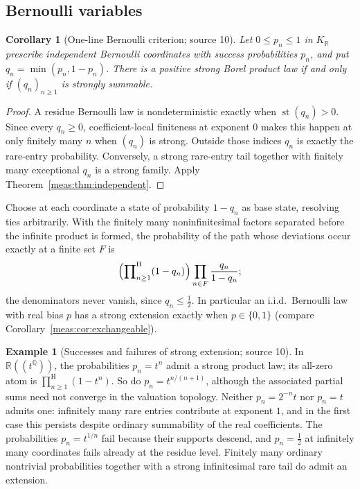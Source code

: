 \documentclass[11pt]{article}
\numberwithin{equation}{section}
\newtheorem{corollary}[theorem]{Corollary}
\theoremstyle{definition}
\newtheorem{example}[theorem]{Example}
\theoremstyle{remark}
\newcommand{\R}{\mathbb R}
\newcommand{\Q}{\mathbb Q}
\newcommand{\KR}{K_{\R}}
\newcommand{\st}{\operatorname{st}}
\newcommand{\hprod}{\mathop{\prod}\nolimits^{\mathrm H}}
\begin{document}
\subsection{Bernoulli variables}

\begin{corollary}[One-line Bernoulli criterion; source 10]
\label{meas:cor:bernoulli}
Let $0\le p_n\le1$ in $\KR$ prescribe independent Bernoulli coordinates with
success probabilities $p_n$, and put $q_n=\min(p_n,1-p_n)$. There is a positive
strong Borel product law if and only if $(q_n)_{n\ge1}$ is strongly summable.
\end{corollary}
\begin{proof}
A residue Bernoulli law is nondeterministic exactly when $\st(q_n)>0$. Since
every $q_n\ge0$, coefficient-local finiteness at exponent $0$ makes this happen
at only finitely many $n$ when $(q_n)$ is strong. Outside those indices $q_n$ is
exactly the rare-entry probability. Conversely, a strong rare-entry tail
together with finitely many exceptional $q_n$ is a strong family. Apply
Theorem~\ref{meas:thm:independent}.
\end{proof}

Choose at each coordinate a state of probability $1-q_n$ as base state,
resolving ties arbitrarily. With the finitely many noninfinitesimal factors
separated before the infinite product is formed, the probability of the path
whose deviations occur exactly at a finite set $F$ is
\begin{equation}\label{meas:eq:bernoulli-atom}
 \Bigl(\hprod_{n\ge1}(1-q_n)\Bigr)\prod_{n\in F}\frac{q_n}{1-q_n};
\end{equation}
the denominators never vanish, since $q_n\le\frac12$. In particular an i.i.d.\
Bernoulli law with real bias $p$ has a strong extension exactly when
$p\in\{0,1\}$ (compare Corollary~\ref{meas:cor:exchangeable}).

\begin{example}[Successes and failures of strong extension; source 10]
\label{meas:ex:bernoulli}
In $\R((t^\Q))$, the probabilities $p_n=t^n$ admit a strong product law;
its all-zero atom is
$\hprod_{n\ge1}(1-t^n)$. So do $p_n=t^{n/(n+1)}$, although the associated
partial sums need not converge in the valuation topology. Neither
$p_n=2^{-n}t$ nor $p_n=t$ admits one: infinitely many rare entries contribute at
exponent $1$, and in the first case this persists despite ordinary
summability of the real coefficients. The probabilities $p_n=t^{1/n}$ fail
because their supports descend, and $p_n=\frac12$ at infinitely many coordinates
fails already at the residue level. Finitely many ordinary nontrivial
probabilities together with a strong infinitesimal rare tail do admit an
extension.
\end{example}
\end{document}
